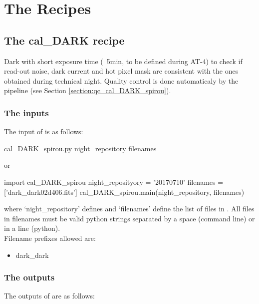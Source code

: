 \chapter{The Recipes}
\label{ch:the_recipes}


\clearpage
\newpage
\section{The cal\_DARK recipe}
\label{ch:the_recipes:cal_DARK_spirou}

Dark with short exposure time (~5min, to be defined during AT-4) to check if read-out noise, dark current and hot pixel mask are consistent with the ones obtained during technical night. Quality control is done automaticaly by the pipeline (see Section \ref{section:qc_cal_DARK_spirou}). \\


\subsection{The inputs}
The input of \calDARK is as follows:
\begin{cmdbox}
cal_DARK_spirou.py  night_repository  filenames
\end{cmdbox}
\noindent or
\begin{pythonbox}
import cal_DARK_spirou
night_reposityory = '20170710'
filenames = ['dark_dark02d406.fits']
cal_DARK_spirou.main(night_repository, filenames)
\end{pythonbox}

\noindent where `night\_repository' defines \argnightname and `filenames' define the list of files in \argfilenames. All files in filenames must be valid python strings separated by a space (command line) or in a line (python). \\

\noindent Filename prefixes allowed are:
\begin{itemize}
	\item dark\_dark
\end{itemize}

\subsection{The outputs}
The outputs of \calDARK are as follows:

